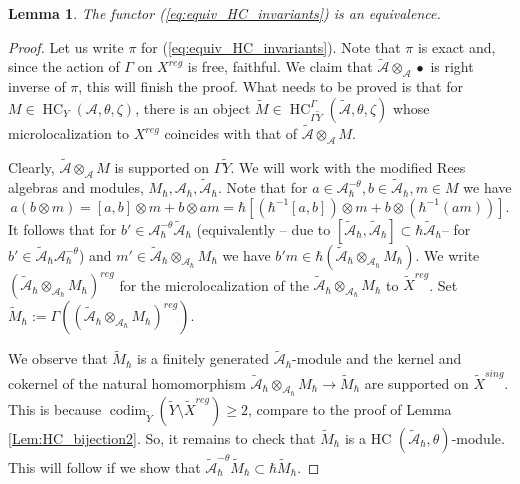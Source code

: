\documentclass[12pt]{amsart}
\newcommand{\A}{\mathcal{A}}
\newcommand{\HC}{\operatorname{HC}}
\newtheorem{Lem}[Thm]{Lemma}
\theoremstyle{definition}
\numberwithin{equation}{section}
\begin{document}
\begin{Lem}\label{Lem:lift}
The functor (\ref{eq:equiv_HC_invariants}) is an equivalence.
\end{Lem}
\begin{proof}
Let us write $\pi$ for (\ref{eq:equiv_HC_invariants}). Note that $\pi$ is exact and, since
the action of $\Gamma$ on $X^{reg}$ is free, faithful. We claim that $\tilde{\A}\otimes_{\A}\bullet$
is right inverse of $\pi$, this will finish the proof. What needs to be proved is that for
$M\in \HC_Y(\A,\theta,\zeta)$, there is an object $\tilde{M}\in \HC^\Gamma_{\Gamma\widetilde{Y}}(\tilde{\A},\theta,\zeta)$
whose microlocalization to $X^{reg}$ coincides with that of $\tilde{\A}\otimes_{\A}M$.

Clearly, $\tilde{\A}\otimes_\A M$ is supported on $\Gamma\tilde{Y}$. We will work with the
modified Rees algebras and modules, $M_\hbar,\A_\hbar, \tilde{\A}_\hbar$. Note that for
$a\in \A_\hbar^{-\theta},b\in \tilde{\A}_\hbar, m\in M$ we have
$$a(b\otimes m)=[a,b]\otimes m+ b\otimes am=\hbar [(\hbar^{-1}[a,b])\otimes m+ b\otimes (\hbar^{-1}(am))].$$
It follows that for $b'\in  \A_\hbar^{-\theta}\tilde{\A}_\hbar$ (equivalently -- due to $[\tilde{\A}_\hbar,\tilde{\A}_\hbar]\subset \hbar \tilde{\A}_\hbar$-- for $b'\in  \tilde{\A}_\hbar\A_\hbar^{-\theta}$) and $m'\in \tilde{\A}_\hbar\otimes_{\A_\hbar}M_\hbar$ we have
$b'm\in \hbar (\tilde{\A}_\hbar\otimes_{\A_\hbar}M_\hbar)$.
We write $(\tilde{\A}_\hbar\otimes_{\A_\hbar}M_\hbar)^{reg}$ for  the microlocalization of the $\tilde{\A}_\hbar\otimes_{\A_\hbar}M_\hbar$ to $\tilde{X}^{reg}$.
Set $\tilde{M}_\hbar:=\Gamma((\tilde{\A}_\hbar\otimes_{\A_\hbar}M_\hbar)^{reg})$.

We observe that $\tilde{M}_\hbar$ is a finitely generated $\tilde{\A}_\hbar$-module and the kernel and
cokernel of the natural homomorphism $\tilde{\A}_\hbar\otimes_{\A_\hbar}M_\hbar
\rightarrow \tilde{M}_\hbar$ are supported on $\tilde{X}^{sing}$. This is because $\operatorname{codim}_{\tilde{Y}}(\tilde{Y}\setminus \tilde{X}^{reg})\geqslant 2$, compare
to the proof of Lemma \ref{Lem:HC_bijection2}. So, it remains to check that
$\tilde{M}_\hbar$ is a HC $(\tilde{\A}_\hbar,\theta)$-module. This will follow if we show that
$\tilde{\A}_\hbar^{-\theta}\tilde{M}_\hbar\subset \hbar \tilde{M}_\hbar$.


\end{proof}
\end{document}
